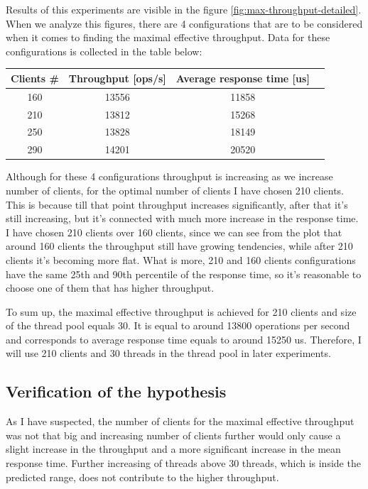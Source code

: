 \documentclass[11pt]{article}
\begin{document}
Results of this experiments are visible in the figure \ref{fig:max-throughput-detailed}. When we analyze this figures, there are 4 configurations that are to be considered when it comes to finding the maximal effective throughput. Data for these configurations is collected in the table below:

\medskip

\begin{tabular}{|c|c|c|c|}
\hline \bf{Clients \#} & Throughput [ops/s] &\bf{Average response time [us]}  \\
\hline 160 & 13556 & 11858 \\
\hline 210 & 13812 & 15268 \\
\hline 250 & 13828 & 18149 \\
\hline 290 & 14201 & 20520 \\
\hline
\end{tabular}
\medskip

Although for these 4 configurations throughput is increasing as we increase number of clients, for the optimal number of clients I have chosen 210 clients. This is because till that point throughput increases significantly, after that it's still increasing, but it's connected with much more increase in the response time. I have chosen 210 clients over 160 clients, since we can see from the plot that around 160 clients the throughput still have growing tendencies, while after 210 clients it's becoming more flat. What is more, 210 and 160 clients configurations have the same 25th and 90th percentile of the response time, so it's reasonable to choose one of them that has higher throughput.

To sum up, the maximal effective throughput is achieved for 210 clients and size of the thread pool equals 30. It is equal to around 13800 operations per second and corresponds to average response time equals to around 15250 us. Therefore, I will use 210 clients and 30 threads in the thread pool in later experiments.  

\subsection{Verification of the hypothesis}

As I have suspected, the number of clients for the maximal effective throughput was not that big and increasing number of clients further would only cause a slight increase in the throughput and a more significant increase in the mean response time. Further increasing of threads above 30 threads, which is inside the predicted range, does not contribute to the higher throughput.
\end{document}
